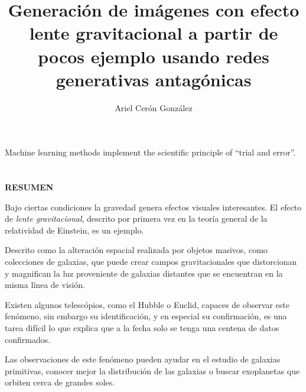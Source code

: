 \documentclass[letterpaper,12pt,oneside]{book}
\author{Ariel Cerón González}
\title{Generación de imágenes con efecto lente gravitacional a partir de pocos ejemplo usando redes generativas antagónicas}
\begin{document}
    
        \frontmatter
        \maketitle
        
        \chapter*{}
            \begin{flushright}%
                \vspace*{0.5cm}
                \thispagestyle{empty}
                Machine learning methods implement the scientific principle of “trial and error”.\\

                    \cite{jung2022ml}
            \end{flushright}
            
        \chapter*{}
        \vspace*{-1.5 cm}
            \begin{center}
                {\LARGE{\bf RESUMEN}}\\
            \end{center}   
                Bajo ciertas condiciones la gravedad genera efectos visuales interesantes. El efecto de {\it lente gravitacional}, descrito por primera vez en la teoría general de la relatividad de Einstein, es un ejemplo. 
                
                Descrito como la alteración espacial realizada por objetos masivos, como colecciones de galaxias, que puede crear campos gravitacionales que distorcionan y magnifican la luz proveniente de galaxias distantes que se encuentran en la misma línea de visión. 

                Existen algunos telescópios, como el Hubble o Euclid, capaces de observar este fenómeno, sin embargo su identificación, y en especial su confirmación, es una tarea difícil lo que explica que a la fecha solo se tenga una centena de datos confirmados.
                
                Las observaciones de este fenómeno pueden ayudar en el estudio de galaxias primitivas, conocer mejor la distribución de las galaxias o buscar exoplanetas que orbiten cerca de grandes soles. 
\end{document}
